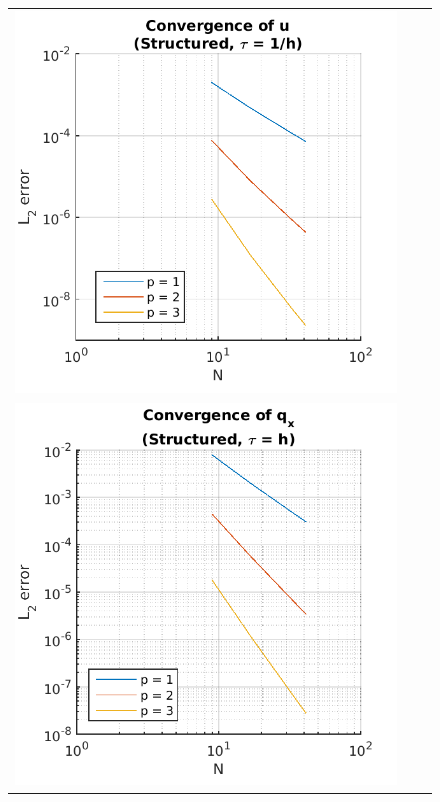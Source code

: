 \documentclass{article}
\begin{document}
\begin{figure}
\begin{tabular}{c c c}
\includegraphics[scale=0.5]{cs_3.png} \\
\includegraphics[scale=0.5]{csqx_1.png} & 

\end{tabular}
\end{figure}
\end{document}
